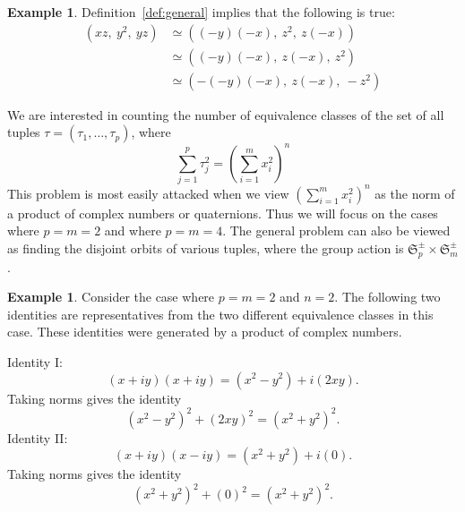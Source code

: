\documentclass[12pt,table]{article}
\theoremstyle{definition}
\newtheorem{example}[theorem]{Example}
\theoremstyle{remark}
\newcommand{\Zzz}{\mathbb Z}
\numberwithin{equation}{section}
\begin{document}
\begin{example}
Definition~\ref{def:general} implies that the following is true:
\begin{align*}
( xz,\: y^2,\: yz )  
&\simeq ( (-y)(-x),\: z^2,\: z(-x) ) \\
&\simeq ( (-y)(-x),\: z(-x),\: z^2 ) \\
&\simeq ( -(-y)(-x),\: z(-x),\: -z^2 ) 
\end{align*}
\end{example}



We are interested in counting the number of
equivalence classes of the set of all tuples
 $ \tau = ( \tau_1, \dotsc, \tau_p) $,
where
\begin{equation}
\label{equation_general}
\sum_{j = 1}^{p}  \tau_j ^ 2  
= 
\left( \sum_{i = 1}^{m}  x_i ^ 2  \right) ^ n 
\end{equation}
This problem is most easily attacked when we
view $ \left( \sum_{i = 1}^{m}  x_i ^ 2  \right) ^ n $
as the norm of a product of complex numbers or quaternions.
Thus we will focus on the cases where $ p = m = 2 $ and where $ p = m = 4 $.
The general problem can also be viewed as finding the disjoint orbits of 
various tuples, where the group action is $ \mathfrak{S}_p^\pm \times \mathfrak{S}_m^\pm $.



\begin{example}

Consider the case where $ p = m = 2 $ and $ n = 2$.
The following two identities are representatives from 
the two different equivalence classes in this case. These identities
were generated by a product of complex numbers. 

\noindent
Identity I:
\begin{equation*}
(x + iy)(x + iy) = (x^2 - y^2 ) + i(2xy).
\end{equation*}
Taking norms gives the identity
\begin{equation}
\label{eq:Pythagorean}
    (x^2 - y^2 )^2 + (2xy)^2 
    = (x^2 + y^2)^2.
\end{equation}
Identity II:
\begin{equation*}
    (x + iy )(x - iy )
    = (x^2 + y^2 ) + i(0).
\end{equation*}
Taking norms gives the identity
\begin{equation}
    (x^2 + y^2 )^2 + (0)^2
    = (x^2 + y^2 )^2.
\end{equation}
\end{example}
\end{document}
